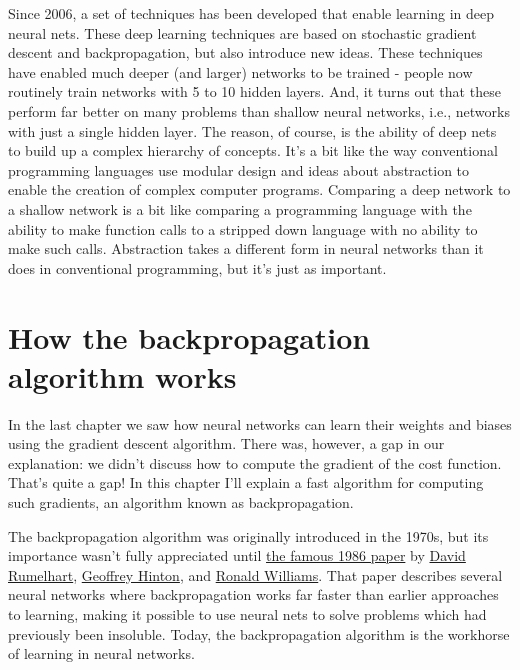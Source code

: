 \documentclass[a4paper,12pt]{report}%
\begin{document}
\smallskip

Since 2006, a set of techniques has been developed that enable learning in deep neural nets. These deep learning techniques are based on stochastic gradient descent and backpropagation, but also introduce new ideas. These techniques have enabled much deeper (and larger) networks to be trained - people now routinely train networks with 5 to 10 hidden layers. And, it turns out that these perform far better on many problems than shallow neural networks, i.e., networks with just a single hidden layer. The reason, of course, is the ability of deep nets to build up a complex hierarchy of concepts. It's a bit like the way conventional programming languages use modular design and ideas about abstraction to enable the creation of complex computer programs. Comparing a deep network to a shallow network is a bit like comparing a programming language with the ability to make function calls to a stripped down language with no ability to make such calls. Abstraction takes a different form in neural networks than it does in conventional programming, but it's just as important.




\chapter{\color{IAF} \bf How the backpropagation algorithm works}

In the last chapter we saw how neural networks can learn their weights and biases using the gradient descent algorithm. There was, however, a gap in our explanation: we didn't discuss how to compute the gradient of the cost function. That's quite a gap! In this chapter I'll explain a fast algorithm for computing such gradients, an algorithm known as backpropagation.

\smallskip

The backpropagation algorithm was originally introduced in the 1970s, but its importance wasn't fully appreciated until \href{http://www.nature.com/nature/journal/v323/n6088/pdf/323533a0.pdf}{the famous 1986 paper} by \href{https://en.wikipedia.org/wiki/David_Rumelhart}{David Rumelhart}, \href{http://www.cs.toronto.edu/~hinton/}{Geoffrey Hinton}, and \href{http://www.ccs.neu.edu/home/rjw/}{Ronald Williams}. That paper describes several neural networks where backpropagation works far faster than earlier approaches to learning, making it possible to use neural nets to solve problems which had previously been insoluble. Today, the backpropagation algorithm is the workhorse of learning in neural networks.
\end{document}
